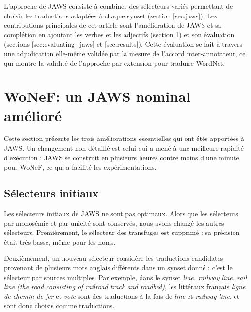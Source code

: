L'approche de JAWS consiste à combiner des sélecteurs variés permettant de
choisir les traductions adaptées à chaque synset (section \ref{sec:jaws}). Les
contributions principales de cet article sont l'amélioration de JAWS et sa
complétion en ajoutant les verbes et les adjectifs (section
\ref{sec:improving_jaws}) et son évaluation (sections \ref{sec:evaluating_jaws}
et \ref{sec:results}). Cette évaluation se fait à travers une adjudication
elle-même validée par la mesure de l'accord inter-annotateur, ce qui montre la
validité de l'approche par extension pour traduire WordNet.

\section{WoNeF: un JAWS nominal amélioré}
\label{sec:improving_jaws}

Cette section présente les trois améliorations essentielles qui ont étés
apportées à JAWS. Un changement non détaillé est celui qui a mené à une
meilleure rapidité d'exécution : JAWS se construit en plusieurs heures contre
moins d'une minute pour WoNeF, ce qui a facilité les expérimentations.

\subsection{Sélecteurs initiaux}
\label{subsec:revisiting_extraction_heuristics}


Les sélecteurs initiaux de JAWS ne sont pas optimaux. Alors que les sélecteurs
par monosémie et par unicité sont conservés, nous avons changé les autres
sélecteurs. Premièrement, le sélecteur des transfuges est supprimé : sa
précision était très basse, même pour les noms.

Deuxièmement, un nouveau sélecteur considère les traductions candidates
provenant de plusieurs mots anglais différents dans un synset donné : c'est le
sélecteur par sources multiples. Par exemple, dans le synset \textit{line,
railway line, rail line (the road consisting of railroad track and roadbed)},
les littéraux français \textit{ligne de chemin de fer} et \textit{voie} sont
des traductions à la fois de \textit{line} et \textit{railway line}, et sont
donc choisis comme traductions.

